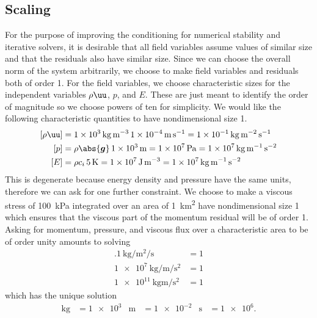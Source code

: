 \subsection{Scaling}\label{sec:vhtscaling}
For the purpose of improving the conditioning for numerical stability and iterative solvers, it is desirable that all field variables assume values of similar size and that the residuals also have similar size.
Since we can choose the overall norm of the system arbitrarily, we choose to make field variables and residuals both of order 1.
For the field variables, we choose characteristic sizes for the independent variables $\rho\uu$, $p$, and $E$.
These are just meant to identify the order of magnitude so we choose powers of ten for simplicity.
We would like the following characteristic quantities to have nondimensional size 1.
\begin{equation}\label{eq:vhtsizes}
  \begin{split}
    [\rho\uu] &= \SI{1e3}{\kilo\gram\per\metre\cubed} \, \SI{1e-4}{\metre\per\second} = \SI{1e-1}{\kilo\gram\per\metre\squared\per\second} \\
    [p] &= \rho \abs{\bm g} \, \SI{1e3}{\metre} = \SI{1e7}{\pascal} = \SI{1e7}{\kilo\gram\per\metre\per\second\squared} \\
    [E] &= \rho c_i \, \SI{5}{\kelvin} = \SI{1e7}{\joule\per\metre\cubed} = \SI{1e7}{\kilo\gram\per\metre\per\second\squared} \\
  \end{split}
\end{equation}
This is degenerate because energy density and pressure have the same units, therefore we can ask for one further constraint.
We choose to make a viscous stress of \SI{100}{\kilo\pascal} integrated over an area of \SI{1}{\kilo\metre\squared} have nondimensional size 1 which ensures that the viscous part of the momentum residual will be of order 1.
Asking for momentum, pressure, and viscous flux over a characteristic area to be of order unity amounts to solving
\begin{align*}
  \SI{.1}{\kilogram\per\metre\squared\per\second} &= 1 \\
  \SI{1e7}{\kilo\gram\per\metre\per\second\squared} &= 1 \\
  \SI{1e11}{\kilo\gram\metre\per\second\squared} &= 1
\end{align*}
which has the unique solution
\begin{align}\label{eq:vhtunits}
  \si{\kilo\gram} &= \num{1e3} & \si{\metre} &= \num{1e-2} & \si{\second} &= \num{1e6} .
\end{align}
